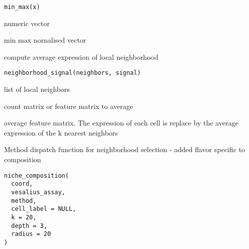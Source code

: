 \documentclass[a4paper]{book}
\begin{document}
%
\begin{Usage}
\begin{verbatim}
min_max(x)
\end{verbatim}
\end{Usage}
%
\begin{Arguments}
\begin{ldescription}
\item[\code{x}] numeric vector
\end{ldescription}
\end{Arguments}
%
\begin{Value}
min max nornalised vector
\end{Value}
%
\begin{Description}
compute average expression of local neighborhood
\end{Description}
%
\begin{Usage}
\begin{verbatim}
neighborhood_signal(neighbors, signal)
\end{verbatim}
\end{Usage}
%
\begin{Arguments}
\begin{ldescription}
\item[\code{neighbors}] list of local neighbors

\item[\code{signal}] count matrix or feature matrix to average
\end{ldescription}
\end{Arguments}
%
\begin{Value}
average feature matrix. The expression of each cell 
is replace by the average expression of the k nearest neighbors
\end{Value}
%
\begin{Description}
Method dispatch function for neighborhood selection - added
flavor specific to composition
\end{Description}
%
\begin{Usage}
\begin{verbatim}
niche_composition(
  coord,
  vesalius_assay,
  method,
  cell_label = NULL,
  k = 20,
  depth = 3,
  radius = 20
)
\end{verbatim}
\end{Usage}
%
\end{document}
